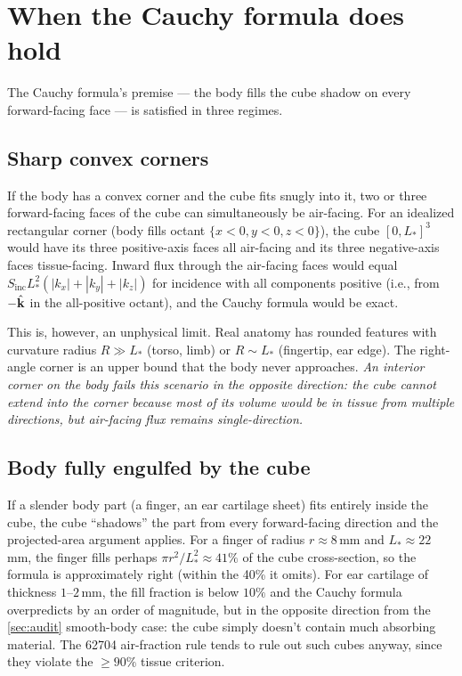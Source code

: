 \documentclass[11pt,a4paper]{article}
\theoremstyle{definition}
\theoremstyle{remark}
\newcommand{\Sinc}{S_{\mathrm{inc}}}
\newcommand{\khat}{\hat{\vb{k}}}
\newcommand{\Lact}{L_{\!*}}
\begin{document}
\section{When the Cauchy formula does hold}
\label{sec:limits}

The Cauchy formula's premise --- the body fills the cube shadow on
every forward-facing face --- is satisfied in three regimes.

\subsection{Sharp convex corners}\label{sec:corner}

If the body has a convex corner and the cube fits snugly into it,
two or three forward-facing faces of the cube can simultaneously be
air-facing. For an idealized rectangular corner (body fills octant
$\{x<0,y<0,z<0\}$), the cube
$[0,\Lact]^3$ would have its three positive-axis faces all
air-facing and its three negative-axis faces tissue-facing. Inward
flux through the air-facing faces would equal
$\Sinc\Lact^2(|k_x|+|k_y|+|k_z|)$ for incidence with all components
positive (i.e., from $-\khat$ in the all-positive octant), and the
Cauchy formula would be exact.

This is, however, an unphysical limit. Real anatomy has rounded
features with curvature radius $R\gg\Lact$ (torso, limb) or
$R\sim\Lact$ (fingertip, ear edge). The right-angle corner is an
upper bound that the body never approaches. \emph{An interior corner
on the body fails this scenario in the opposite direction: the cube
cannot extend into the corner because most of its volume would be
in tissue from multiple directions, but air-facing flux remains
single-direction.}

\subsection{Body fully engulfed by the cube}\label{sec:engulf}

If a slender body part (a finger, an ear cartilage sheet) fits
entirely inside the cube, the cube ``shadows'' the part from every
forward-facing direction and the projected-area argument applies. For
a finger of radius $r\approx 8$\,mm and $\Lact\approx 22$\,mm, the
finger fills perhaps $\pi r^2 / \Lact^2\approx 41\%$ of the cube
cross-section, so the formula is approximately right (within the
40\% it omits). For ear cartilage of thickness $1$--$2$\,mm, the
fill fraction is below $10\%$ and the Cauchy formula overpredicts
by an order of magnitude, but in the opposite direction from the
\cref{sec:audit} smooth-body case: the cube simply doesn't contain
much absorbing material. The 62704 air-fraction rule tends to rule
out such cubes anyway, since they violate the $\geq 90\%$ tissue
criterion.
\end{document}

